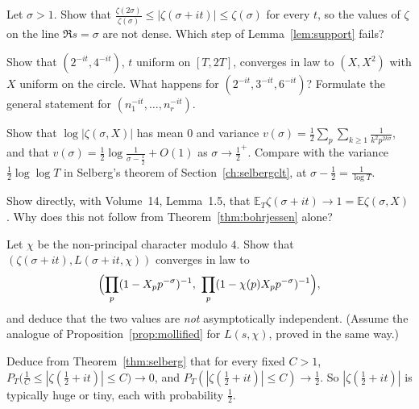 \begin{exercise}[$\star$]\label{ex:sigmabig}
Let $\sigma>1$. Show that $\frac{\zeta(2\sigma)}{\zeta(\sigma)}\le|\zeta(\sigma+it)|\le\zeta(\sigma)$ for every $t$, so the values of $\zeta$ on the line $\Re s=\sigma$ are not dense. Which step of Lemma~\ref{lem:support} fails?
\end{exercise}

\begin{exercise}[$\star\star$]\label{ex:kwfail}
Show that $(2^{-it},4^{-it})$, $t$ uniform on $[T,2T]$, converges in law to $(X,X^2)$ with $X$ uniform on the circle. What happens for $(2^{-it},3^{-it},6^{-it})$? Formulate the general statement for $(n_1^{-it},\dots,n_r^{-it})$.
\end{exercise}

\begin{exercise}[$\star\star$]\label{ex:varbj}
Show that $\log|\zeta(\sigma,X)|$ has mean $0$ and variance $v(\sigma)=\frac12\sum_p\sum_{k\ge1}\frac1{k^2p^{2k\sigma}}$, and that $v(\sigma)=\frac12\log\frac1{\sigma-\frac12}+O(1)$ as $\sigma\to\frac12^+$. Compare with the variance $\frac12\log\log T$ in Selberg's theorem of Section~\ref{ch:selbergclt}, at $\sigma-\frac12=\frac1{\log T}$.
\end{exercise}

\begin{exercise}[$\star\star$]\label{ex:meanzeta}
Show directly, with Volume~14, Lemma~1.5, that $\mathbb E_T\zeta(\sigma+it)\to1=\mathbb E\zeta(\sigma,X)$. Why does this not follow from Theorem~\ref{thm:bohrjessen} alone?
\end{exercise}

\begin{exercise}[$\star\star\star$]\label{ex:jointbj}
Let $\chi$ be the non-principal character modulo $4$. Show that $(\zeta(\sigma+it),L(\sigma+it,\chi))$ converges in law to
\[
\Bigl(\prod_p(1-X_pp^{-\sigma})^{-1},\ \prod_p(1-\chi(p)X_pp^{-\sigma})^{-1}\Bigr),
\]
and deduce that the two values are \emph{not} asymptotically independent. (Assume the analogue of Proposition~\ref{prop:mollified} for $L(s,\chi)$, proved in the same way.)
\end{exercise}

\begin{exercise}[$\star$]\label{ex:typical}
Deduce from Theorem~\ref{thm:selberg} that for every fixed $C>1$, $P_T\bigl(\frac1C\le|\zeta(\frac12+it)|\le C\bigr)\to0$, and $P_T(|\zeta(\frac12+it)|\le C)\to\frac12$. So $|\zeta(\frac12+it)|$ is typically huge or tiny, each with probability $\frac12$.
\end{exercise}

